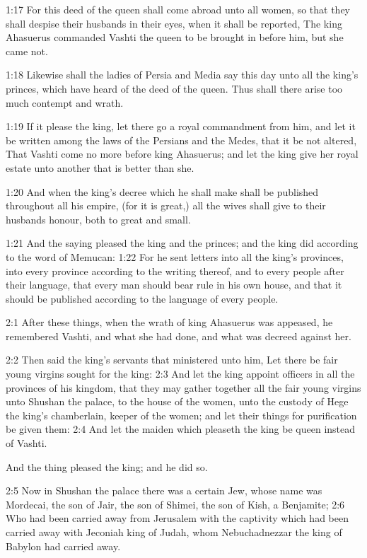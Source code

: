 1:17 For this deed of the queen shall come abroad unto all women, so that they shall despise their husbands in their eyes, when it shall be reported, The king Ahasuerus commanded Vashti the queen to be brought in before him, but she came not.

1:18 Likewise shall the ladies of Persia and Media say this day unto all the king's princes, which have heard of the deed of the queen.  Thus shall there arise too much contempt and wrath.

1:19 If it please the king, let there go a royal commandment from him, and let it be written among the laws of the Persians and the Medes, that it be not altered, That Vashti come no more before king Ahasuerus; and let the king give her royal estate unto another that is better than she.

1:20 And when the king's decree which he shall make shall be published throughout all his empire, (for it is great,) all the wives shall give to their husbands honour, both to great and small.

1:21 And the saying pleased the king and the princes; and the king did according to the word of Memucan: 1:22 For he sent letters into all the king's provinces, into every province according to the writing thereof, and to every people after their language, that every man should bear rule in his own house, and that it should be published according to the language of every people.

2:1 After these things, when the wrath of king Ahasuerus was appeased, he remembered Vashti, and what she had done, and what was decreed against her.

2:2 Then said the king's servants that ministered unto him, Let there be fair young virgins sought for the king: 2:3 And let the king appoint officers in all the provinces of his kingdom, that they may gather together all the fair young virgins unto Shushan the palace, to the house of the women, unto the custody of Hege the king's chamberlain, keeper of the women; and let their things for purification be given them: 2:4 And let the maiden which pleaseth the king be queen instead of Vashti.

And the thing pleased the king; and he did so.

2:5 Now in Shushan the palace there was a certain Jew, whose name was Mordecai, the son of Jair, the son of Shimei, the son of Kish, a Benjamite; 2:6 Who had been carried away from Jerusalem with the captivity which had been carried away with Jeconiah king of Judah, whom Nebuchadnezzar the king of Babylon had carried away.

